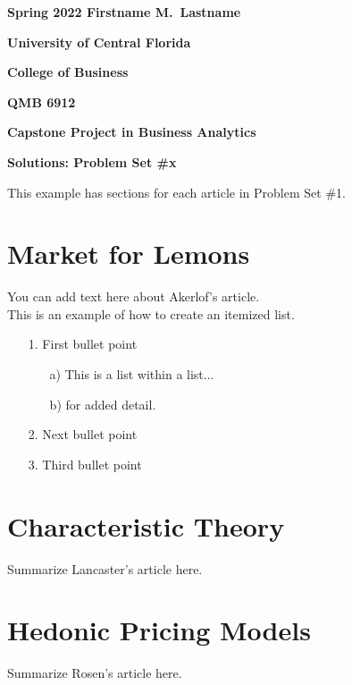 \documentclass[11pt]{book}
\begin{document}
\pagestyle{empty}
{\noindent\bf Spring 2022 \hfill Firstname M.~Lastname}
\vskip 16pt
\centerline{\bf University of Central Florida}
\centerline{\bf College of Business}
\vskip 16pt
\centerline{\bf QMB 6912}
\centerline{\bf Capstone Project in Business Analytics}
\vskip 10pt
\centerline{\bf Solutions:  Problem Set \#x}
\vskip 32pt

This example has sections for each article in Problem Set \#1.

\section{Market for Lemons}


\noindent You can add text here about Akerlof's article. \\

This is an example of how to create an itemized list.

\begin{itemize}
\item[1.] First bullet point
	
	\begin{itemize}
	\item[a)] This is a list within a list...
	
	\item[b)] for added detail.
	\end{itemize}
	
\item[2.] Next bullet point
\item[3.] Third bullet point

\end{itemize}

\section{Characteristic Theory}

Summarize Lancaster's article here.


\section{Hedonic Pricing Models}

Summarize Rosen's article here. 
\end{document}
